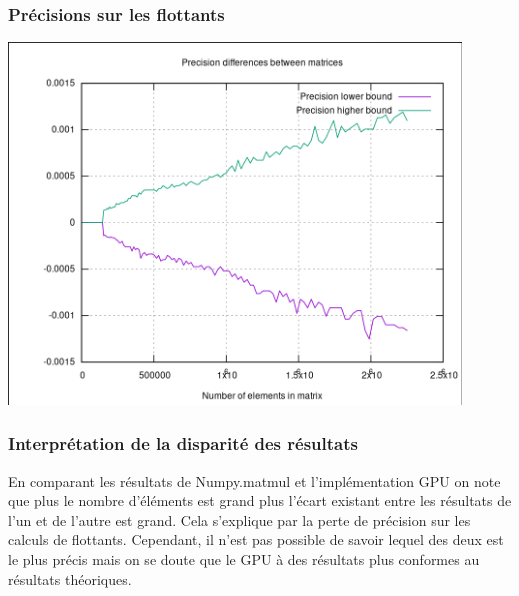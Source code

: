 \documentclass[8pt]{beamer}
\begin{document}
\begin{frame}
    \frametitle{Précisions sur les flottants}
    \begin{center}
    \includegraphics[width=0.9\textwidth]{../resources/matrix_naive_float_precision.pdf}
    \end{center}
\end{frame}

\begin{frame}
    \frametitle{Interprétation de la disparité des résultats}
    En comparant les résultats de Numpy.matmul et l'implémentation GPU on 
    note que plus le nombre d'éléments est grand plus l'écart existant entre 
    les résultats de l'un et de l'autre est grand. Cela s'explique par la 
    perte de précision sur les calculs de flottants. Cependant, il n'est pas 
    possible de savoir lequel des deux est le plus précis mais on se doute que 
    le GPU à des résultats plus conformes au résultats théoriques.
\end{frame}
\end{document}
